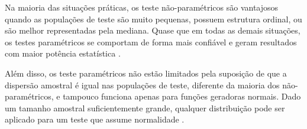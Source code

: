 Na maioria das situações práticas, os teste não-paramétricos são vantajosos quando as
populações de teste são muito pequenas, possuem estrutura ordinal, ou são melhor representadas pela mediana. Quase que em todas as demais situações, os testes paramétricos
se comportam de forma mais confiável e geram resultados com maior potência estatística \cite{Casella2002}.

Além disso, os teste paramétricos não estão limitados pela suposição de que a dispersão
amostral é igual nas populações de teste, diferente da maioria dos não-paramétricos, e
tampouco funciona apenas para funções geradoras normais. Dado um tamanho amostral
suficientemente grande, qualquer distribuição pode ser aplicado para um teste que assume
normalidade \cite{KernsFerro}.

